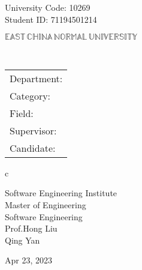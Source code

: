 \newpage

\pagestyle{empty}

\newline
\hspace*{\fill} {University Code: 10269}\\
\hspace*{\fill} {Student ID: 
71194501214
}%

\vskip 2cm

\begin{center}
    {\Huge $\mathbb{EAST}\,\mathbb{CHINA}\,\mathbb{NORMAL}\,
            \mathbb{UNIVERSITY}$}
\end{center}

\vskip 3cm

\begin{center}
    \bfseries{\scshape{\huge \thesisETitle}}\\
\end{center}

\vskip 2cm {\large
        \begin{center}
            \begin{tabular}{l}
                Department:         \\
                Category:              \\
                Field: \\
                Supervisor:         \\
                Candidate:
            \end{tabular}
            \begin{tabular}c

    

                   Software Engineering Institute      \\
                \hline Master of Engineering \\
                \hline Software Engineering \\
                \hline Prof.Hong Liu \\
                \hline Qing Yan \\

                \hline
            \end{tabular}
        \end{center}}

\vskip 30mm

\begin{center}
    {\Large Apr 23, 2023}
\end{center}
